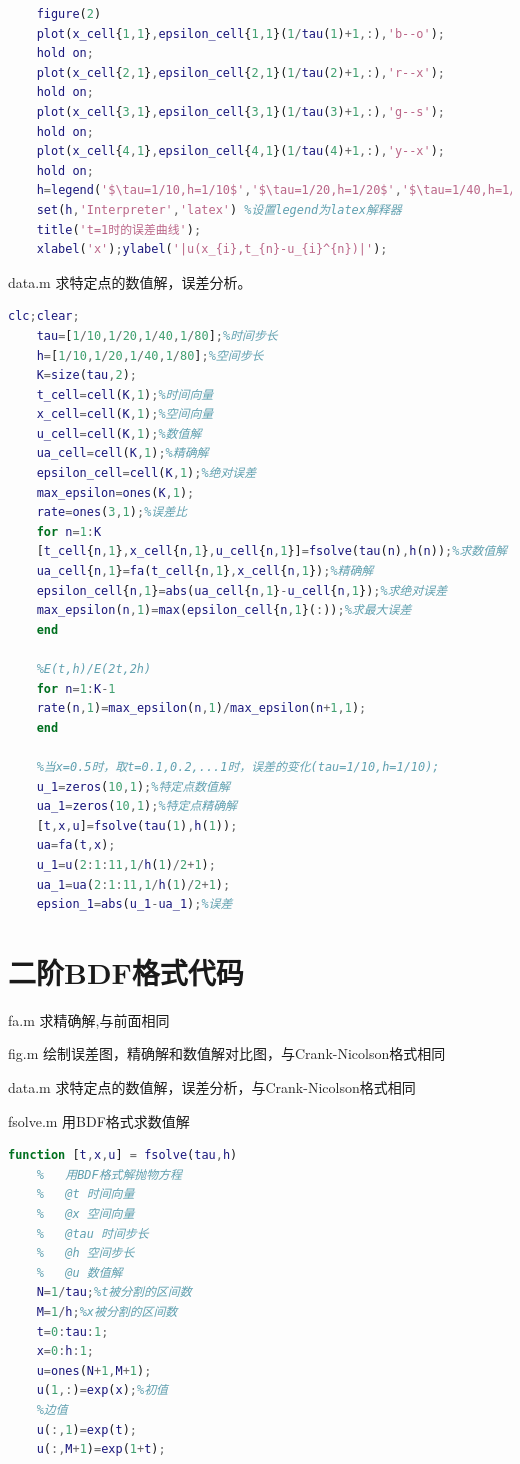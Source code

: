 \documentclass[withoutpreface,bwprint]{cumcmthesis} %
\begin{document}
\begin{appendices}
\begin{lstlisting}[language=matlab]
	%绘制t=1时的误差曲线
	figure(2)
	plot(x_cell{1,1},epsilon_cell{1,1}(1/tau(1)+1,:),'b--o');
	hold on;
	plot(x_cell{2,1},epsilon_cell{2,1}(1/tau(2)+1,:),'r--x');
	hold on;
	plot(x_cell{3,1},epsilon_cell{3,1}(1/tau(3)+1,:),'g--s');
	hold on;
	plot(x_cell{4,1},epsilon_cell{4,1}(1/tau(4)+1,:),'y--x');
	hold on;
	h=legend('$\tau=1/10,h=1/10$','$\tau=1/20,h=1/20$','$\tau=1/40,h=1/40$','$\tau=1/80,h=1/80$');
	set(h,'Interpreter','latex') %设置legend为latex解释器
	title('t=1时的误差曲线');
	xlabel('x');ylabel('|u(x_{i},t_{n}-u_{i}^{n})|');
	\end{lstlisting}
	
	data.m 求特定点的数值解，误差分析。
	\begin{lstlisting}[language=matlab]
	clc;clear;
	tau=[1/10,1/20,1/40,1/80];%时间步长
	h=[1/10,1/20,1/40,1/80];%空间步长
	K=size(tau,2);
	t_cell=cell(K,1);%时间向量
	x_cell=cell(K,1);%空间向量
	u_cell=cell(K,1);%数值解
	ua_cell=cell(K,1);%精确解
	epsilon_cell=cell(K,1);%绝对误差
	max_epsilon=ones(K,1);
	rate=ones(3,1);%误差比
	for n=1:K
	[t_cell{n,1},x_cell{n,1},u_cell{n,1}]=fsolve(tau(n),h(n));%求数值解
	ua_cell{n,1}=fa(t_cell{n,1},x_cell{n,1});%精确解
	epsilon_cell{n,1}=abs(ua_cell{n,1}-u_cell{n,1});%求绝对误差
	max_epsilon(n,1)=max(epsilon_cell{n,1}(:));%求最大误差
	end
	
	%E(t,h)/E(2t,2h)
	for n=1:K-1
	rate(n,1)=max_epsilon(n,1)/max_epsilon(n+1,1);
	end
	
	%当x=0.5时，取t=0.1,0.2,...1时，误差的变化(tau=1/10,h=1/10);
	u_1=zeros(10,1);%特定点数值解
	ua_1=zeros(10,1);%特定点精确解
	[t,x,u]=fsolve(tau(1),h(1));
	ua=fa(t,x);
	u_1=u(2:1:11,1/h(1)/2+1);
	ua_1=ua(2:1:11,1/h(1)/2+1);
	epsion_1=abs(u_1-ua_1);%误差
	\end{lstlisting}
	
	\section{二阶BDF格式代码}
	fa.m 求精确解,与前面相同
	
	fig.m 绘制误差图，精确解和数值解对比图，与Crank-Nicolson格式相同
	
	data.m 求特定点的数值解，误差分析，与Crank-Nicolson格式相同
	
	fsolve.m 用BDF格式求数值解
	\begin{lstlisting}[language=matlab]
	function [t,x,u] = fsolve(tau,h)
	%   用BDF格式解抛物方程
	%   @t 时间向量
	%   @x 空间向量
	%   @tau 时间步长
	%   @h 空间步长
	%   @u 数值解
	N=1/tau;%t被分割的区间数
	M=1/h;%x被分割的区间数
	t=0:tau:1;
	x=0:h:1;
	u=ones(N+1,M+1);
	u(1,:)=exp(x);%初值
	%边值
	u(:,1)=exp(t);
	u(:,M+1)=exp(1+t);
	

\end{lstlisting}
\end{appendices}
\end{document}
